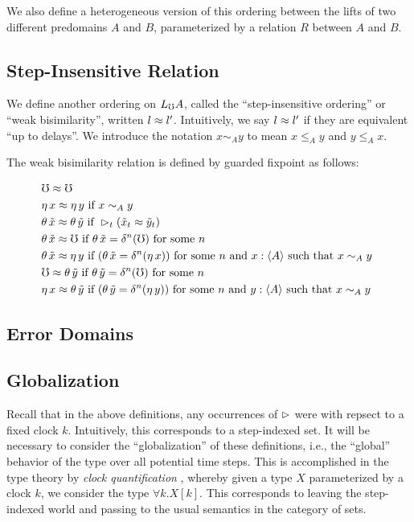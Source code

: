 We also define a heterogeneous version of this ordering between the lifts of two
different predomains $A$ and $B$, parameterized by a relation $R$ between $A$ and $B$.

\subsection{Step-Insensitive Relation}

We define another ordering on $L_\mho A$, called the ``step-insensitive ordering'' or
``weak bisimilarity'', written $l \approx l'$.
Intuitively, we say $l \approx l'$ if they are equivalent ``up to delays''.
We introduce the notation $x \sim_A y$ to mean $x \le_A y$ and $y \le_A x$.

The weak bisimilarity relation is defined by guarded fixpoint as follows:

\begin{align*}
  &\mho \bisim \mho \\
%
  &\eta\, x \bisim \eta\, y \text{ if } 
    x \sim_A y \\
%		
  &\theta\, \tilde{x} \bisim \theta\, \tilde{y} \text{ if } 
    \later_t (\tilde{x}_t \bisim \tilde{y}_t) \\
%	
  &\theta\, \tilde{x} \bisim \mho \text{ if } 
    \theta\, \tilde{x} = \delta^n(\mho) \text { for some $n$ } \\
%	
  &\theta\, \tilde{x} \bisim \eta\, y \text{ if }
    (\theta\, \tilde{x} = \delta^n(\eta\, x))
  \text { for some $n$ and $x : \ty{A}$ such that $x \sim_A y$ } \\
%
  &\mho \bisim \theta\, \tilde{y} \text { if } 
    \theta\, \tilde{y} = \delta^n(\mho) \text { for some $n$ } \\
%	
  &\eta\, x \bisim \theta\, \tilde{y} \text { if }
    (\theta\, \tilde{y} = \delta^n (\eta\, y))
  \text { for some $n$ and $y : \ty{A}$ such that $x \sim_A y$ }
\end{align*}

\subsection{Error Domains}


\subsection{Globalization}

Recall that in the above definitions, any occurrences of $\vartriangleright$ were with
repsect to a fixed clock $k$. Intuitively, this corresponds to a step-indexed set.
It will be necessary to consider the ``globalization'' of these definitions,
i.e., the ``global'' behavior of the type over all potential time steps.
This is accomplished in the type theory by \emph{clock quantification} \cite{atkey-mcbride2013},
whereby given a type $X$ parameterized by a clock $k$, we consider the type
$\forall k. X[k]$. This corresponds to leaving the step-indexed world and passing to
the usual semantics in the category of sets.


